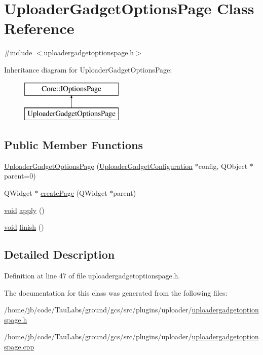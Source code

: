 \hypertarget{class_uploader_gadget_options_page}{\section{\-Uploader\-Gadget\-Options\-Page \-Class \-Reference}
\label{class_uploader_gadget_options_page}
}


{\ttfamily \#include $<$uploadergadgetoptionspage.\-h$>$}

\-Inheritance diagram for \-Uploader\-Gadget\-Options\-Page\-:\begin{figure}[H]
\begin{center}
\leavevmode
\includegraphics[height=2.000000cm]{class_uploader_gadget_options_page}
\end{center}
\end{figure}
\subsection*{\-Public \-Member \-Functions}
\begin{DoxyCompactItemize}
\item 
\hyperlink{group___y_modem_uploader_gae4988774405776fb8a06744eb25e596a}{\-Uploader\-Gadget\-Options\-Page} (\hyperlink{class_uploader_gadget_configuration}{\-Uploader\-Gadget\-Configuration} $\ast$config, \-Q\-Object $\ast$parent=0)
\item 
\-Q\-Widget $\ast$ \hyperlink{group___y_modem_uploader_ga8f7e89743cc3fc8f9e866c4ebe859a9f}{create\-Page} (\-Q\-Widget $\ast$parent)
\item 
\hyperlink{group___u_a_v_objects_plugin_ga444cf2ff3f0ecbe028adce838d373f5c}{void} \hyperlink{group___y_modem_uploader_gaf95a5398d31a86f095fc23d1e7fa878f}{apply} ()
\item 
\hyperlink{group___u_a_v_objects_plugin_ga444cf2ff3f0ecbe028adce838d373f5c}{void} \hyperlink{group___y_modem_uploader_ga85b693be9a5e923d0d5bd7f1c0c50fe9}{finish} ()
\end{DoxyCompactItemize}


\subsection{\-Detailed \-Description}


\-Definition at line 47 of file uploadergadgetoptionspage.\-h.



\-The documentation for this class was generated from the following files\-:\begin{DoxyCompactItemize}
\item 
/home/jb/code/\-Tau\-Labs/ground/gcs/src/plugins/uploader/\hyperlink{uploadergadgetoptionspage_8h}{uploadergadgetoptionspage.\-h}\item 
/home/jb/code/\-Tau\-Labs/ground/gcs/src/plugins/uploader/\hyperlink{uploadergadgetoptionspage_8cpp}{uploadergadgetoptionspage.\-cpp}\end{DoxyCompactItemize}
